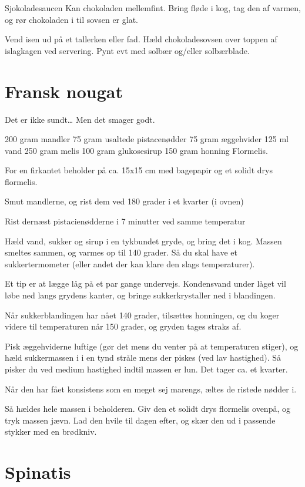 \documentclass[
]{book}
\begin{document}
Sjokoladesaucen
Kan chokoladen mellemfint. Bring fløde i kog, tag den af varmen, og rør
chokoladen i til sovsen er glat.

Vend isen ud på et tallerken eller fad. Hæld chokoladesovsen over toppen af
islagkagen ved servering. Pynt evt med solbær og/eller solbærblade.

\section{Fransk nougat}\label{fransk-nougat}

Det er ikke sundt\ldots{} Men det smager godt.

200 gram mandler
75 gram usaltede pistacenødder
75 gram æggehvider
125 ml vand
250 gram melis
100 gram glukosesirup
150 gram honning
Flormelis.

For en firkantet beholder på ca. 15x15 cm med bagepapir og et solidt drys flormelis.

Smut mandlerne, og rist dem ved 180 grader i et kvarter (i ovnen)

Rist dernæst pistacienødderne i 7 minutter ved samme temperatur

Hæld vand, sukker og sirup i en tykbundet gryde, og bring det i kog. Massen smeltes sammen, og varmes op til 140 grader. Så du skal have et sukkertermometer (eller andet der kan klare den slags temperaturer).

Et tip er at lægge låg på et par gange undervejs. Kondensvand under låget vil løbe ned langs grydens kanter, og bringe sukkerkrystaller ned i blandingen.

Når sukkerblandingen har nået 140 grader, tilsættes honningen, og du koger videre til temperaturen når 150 grader, og gryden tages straks af.

Pisk æggehviderne luftige (gør det mens du venter på at temperaturen stiger), og hæld sukkermassen i i en tynd stråle mens der piskes (ved lav hastighed). Så pisker du ved medium hastighed indtil massen er lun. Det tager ca. et kvarter.

Når den har fået konsistens som en meget sej marengs, æltes de ristede nødder i.

Så hældes hele massen i beholderen. Giv den et solidt drys flormelis ovenpå, og tryk massen jævn. Lad den hvile til dagen efter, og skær den ud i passende stykker med en brødkniv.

\section{Spinatis}\label{spinatis}
\end{document}
